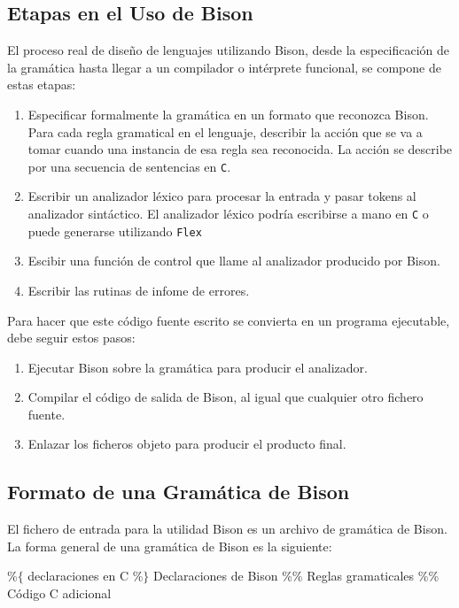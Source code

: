 \documentclass[spanish]{article}
\begin{document}
\subsection{Etapas en el Uso de Bison}
El proceso real de diseño de lenguajes utilizando Bison, desde la especificación de la gramática hasta llegar a un compilador o intérprete funcional, se compone de estas etapas:
	\begin{enumerate}
	\item Especificar formalmente la gramática en un formato que reconozca Bison. Para cada regla gramatical en el lenguaje, describir la acción que se va a tomar cuando una instancia de esa regla sea reconocida. La acción se describe por una secuencia de sentencias en \texttt{C}.
	\item Escribir un analizador léxico para procesar la entrada y pasar tokens al analizador sintáctico. El analizador léxico podría escribirse a mano en \texttt{C} o puede generarse utilizando \texttt{Flex}
	\item Escibir una función de control que llame al analizador producido por Bison.
	\item Escribir las rutinas de infome de errores.
	\end{enumerate}
Para hacer que este código fuente escrito se convierta en un programa ejecutable, debe seguir estos pasos:
	\begin{enumerate}
	\item Ejecutar Bison sobre la gramática para producir el analizador.
	\item Compilar el código de salida de Bison, al igual que cualquier otro fichero fuente.
	\item Enlazar los ficheros objeto para producir el producto final.
	\end{enumerate}
	
\subsection{Formato de una Gramática de Bison}
El fichero de entrada para la utilidad Bison es un archivo de gramática de Bison. La forma general de una gramática de Bison es la siguiente:

{\ttfamily
\%$\lbrace$
\linebreak
declaraciones en C
\linebreak
\%$\rbrace$
\linebreak
Declaraciones de Bison
\linebreak
\%\%
\linebreak
Reglas gramaticales
\linebreak
\%\%
\linebreak
Código C adicional
\linebreak
}
\end{document}
